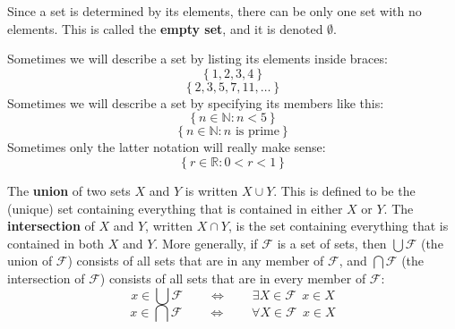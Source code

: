 \documentclass[12pt]{amsart}
\theoremstyle{definition}
\theoremstyle{remark}
\newcommand{\R}{\mathbb{R}}
\newcommand{\N}{\mathbb{N}}
\newcommand{\explicitSet}[1]{\left\lbrace #1 \right\rbrace}
\newcommand{\set}[2]{\explicitSet{#1 \colon #2}}
\newcommand{\0}{\emptyset}
\newcommand{\F}{\mathcal F}
\begin{document}
Since a set is determined by its elements, there can be only one set with no elements. This is called the \textbf{empty set}, and it is denoted $\0$.

Sometimes we will describe a set by listing its elements inside braces:
$$\explicitSet{1,2,3,4}$$
$$\explicitSet{2,3,5,7,11,\dots}$$
Sometimes we will describe a set by specifying its members like this:
$$\set{n \in \N}{n < 5}$$
$$\set{n \in \N}{n \text{ is prime}}$$
Sometimes only the latter notation will really make sense:
$$\set{r \in \R}{0 < r < 1}$$

The \textbf{union} of two sets $X$ and $Y$ is written $X \cup Y$. This is defined to be the (unique) set containing everything that is contained in either $X$ or $Y$. The \textbf{intersection} of $X$ and $Y$, written $X \cap Y$, is the set containing everything that is contained in both $X$ and $Y$. More generally, if $\F$ is a set of sets, then $\bigcup \F$ (the union of $\F$) consists of all sets that are in any member of $\F$, and $\bigcap \F$ (the intersection of $\F$) consists of all sets that are in every member of $\F$:
$$x \in \bigcup \F \qquad \Leftrightarrow \qquad \exists X \in \F \ \ x \in X$$
$$x \in \bigcap \F \qquad \Leftrightarrow \qquad \forall X \in \F \ \ x \in X$$
\end{document}
